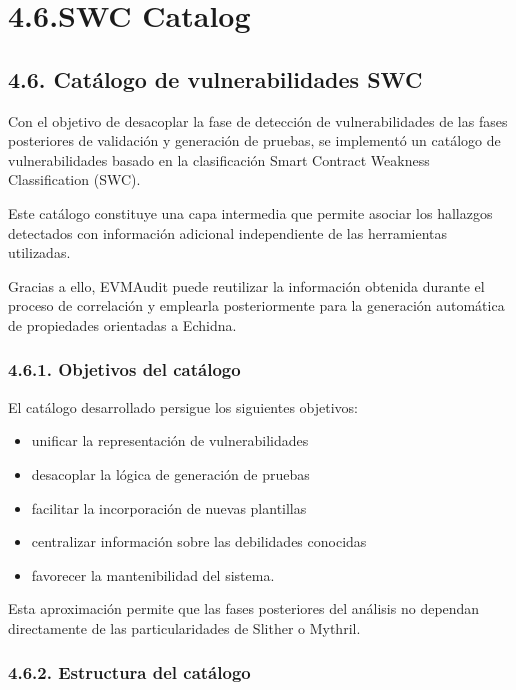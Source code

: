 \section{4.6.SWC Catalog}\label{swc-catalog}

\subsection{4.6. Catálogo de vulnerabilidades
SWC}\label{catuxe1logo-de-vulnerabilidades-swc}

Con el objetivo de desacoplar la fase de detección de vulnerabilidades
de las fases posteriores de validación y generación de pruebas, se
implementó un catálogo de vulnerabilidades basado en la clasificación
Smart Contract Weakness Classification (SWC).

Este catálogo constituye una capa intermedia que permite asociar los
hallazgos detectados con información adicional independiente de las
herramientas utilizadas.

Gracias a ello, EVMAudit puede reutilizar la información obtenida
durante el proceso de correlación y emplearla posteriormente para la
generación automática de propiedades orientadas a Echidna.

\subsubsection{4.6.1. Objetivos del
catálogo}\label{objetivos-del-catuxe1logo}

El catálogo desarrollado persigue los siguientes objetivos:

\begin{itemize}
\tightlist
\item
  unificar la representación de vulnerabilidades
\item
  desacoplar la lógica de generación de pruebas
\item
  facilitar la incorporación de nuevas plantillas
\item
  centralizar información sobre las debilidades conocidas
\item
  favorecer la mantenibilidad del sistema.
\end{itemize}

Esta aproximación permite que las fases posteriores del análisis no
dependan directamente de las particularidades de Slither o Mythril.

\subsubsection{4.6.2. Estructura del
catálogo}\label{estructura-del-catuxe1logo}


